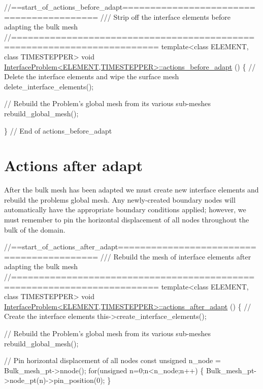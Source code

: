 \begin{DoxyCodeInclude}
\textcolor{comment}{//==start\_of\_actions\_before\_adapt=========================================}
\textcolor{comment}{/// Strip off the interface elements before adapting the bulk mesh}
\textcolor{comment}{}\textcolor{comment}{//========================================================================}
\textcolor{keyword}{template}<\textcolor{keyword}{class} ELEMENT, \textcolor{keyword}{class} TIMESTEPPER>
\textcolor{keywordtype}{void} \hyperlink{classInterfaceProblem_a944e5754e9b3f3394211b6c62f705abe}{InterfaceProblem<ELEMENT,TIMESTEPPER>::actions\_before\_adapt}
      ()
\{
 \textcolor{comment}{// Delete the interface elements and wipe the surface mesh}
 delete\_interface\_elements();
 
 \textcolor{comment}{// Rebuild the Problem's global mesh from its various sub-meshes}
 rebuild\_global\_mesh();

\} \textcolor{comment}{// End of actions\_before\_adapt}

\end{DoxyCodeInclude}




 

\hypertarget{index_after_adapt}{}\section{Actions after adapt}\label{index_after_adapt}
After the bulk mesh has been adapted we must create new interface elements and rebuild the problem\textquotesingle{}s global mesh. Any newly-\/created boundary nodes will automatically have the appropriate boundary conditions applied; however, we must remember to pin the horizontal displacement of all nodes throughout the bulk of the domain.


\begin{DoxyCodeInclude}
\textcolor{comment}{//==start\_of\_actions\_after\_adapt==========================================}
\textcolor{comment}{/// Rebuild the mesh of interface elements after adapting the bulk mesh}
\textcolor{comment}{}\textcolor{comment}{//========================================================================}
\textcolor{keyword}{template}<\textcolor{keyword}{class} ELEMENT, \textcolor{keyword}{class} TIMESTEPPER>
\textcolor{keywordtype}{void} \hyperlink{classInterfaceProblem_a1c8a5dee970dccc3f1da993cf531872d}{InterfaceProblem<ELEMENT,TIMESTEPPER>::actions\_after\_adapt}
      ()
\{
 \textcolor{comment}{// Create the interface elements}
 this->create\_interface\_elements();
 
 \textcolor{comment}{// Rebuild the Problem's global mesh from its various sub-meshes}
 rebuild\_global\_mesh();
 
 \textcolor{comment}{// Pin horizontal displacement of all nodes}
 \textcolor{keyword}{const} \textcolor{keywordtype}{unsigned} n\_node = Bulk\_mesh\_pt->nnode();
 \textcolor{keywordflow}{for}(\textcolor{keywordtype}{unsigned} n=0;n<n\_node;n++) \{ Bulk\_mesh\_pt->node\_pt(n)->pin\_position(0); \}

\end{DoxyCodeInclude}


